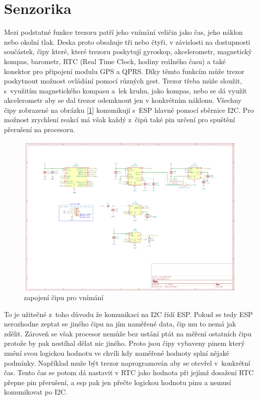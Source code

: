 \section{Senzorika}
Mezi podstatné funkce trezoru patří jeho vnímání veličin jako čas, jeho náklon nebo okolní tlak.
Deska proto obsahuje tři nebo čtyři, v závislosti na dostupnosti součástek, čipy které, které trezoru poskytují gyroskop, akcelerometr, magnetický kompas,
barometr, RTC (Real Time Clock, hodiny reálného času) a také konektor pro připojení modulu GPS a QPRS. Díky těmto funkcím může trezor poskytnout možnost ovládání pomocí různých gest. 
Trezor třeba může sloužit, s~využitím magnetického kompasu a~lek kruhu, jako kompas, nebo se dá využít akcelerometr 
aby se dal trezor odemknout jen v konkrétním náklonu. Všechny čipy zobrazené na obrázku [\ref{fig:E4-sch_vnimani}] komunikují s~ESP hlavně pomocí 
sběrnice I2C. Pro možnost zrychlení reakcí má však každý z~čipů také pin určení pro spuštění přerušení na procesoru. 

\begin{figure}[htbp]
    \centering
    \includegraphics[width=\textwidth]{kapitoly/obrazky/E4/vnimani/sch.png}
    \caption{zapojení čipu pro vnímání}
    \label{fig:E4-sch_vnimani}
\end{figure}

\newpage

To je užitečné z~toho důvodu že komunikaci na I2C řídí ESP. Pokud se tedy ESP nerozhodne zeptat se jiného čipu na jím naměřené data, čip mu to nemá 
jak zdělit. Zároveň se však procesor nemůže bez ustání ptát na měření ostatních čipu protože by pak nestíhal dělat nic jiného. Proto jsou čipy vybaveny 
pinem který změní svou logickou hodnotu ve chvíli kdy naměřené hodnoty splní nějaké podmínky. 
Například muže být trezor naprogramován aby se otevřel 
v~konkrétní čas. Tento čas se potom dá nastavit v RTC jako hodnota při jejímž dosažení RTC přepne pin přerušení, a esp pak jen přečte logickou hodnotu 
pinu a nemusí komunikovat po I2C. %

